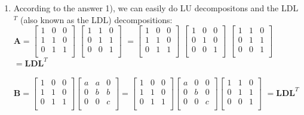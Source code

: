 \documentclass[english,onecolumn]{IEEEtran}
\begin{document}
\begin{enumerate}
    
    
     
    \item 
    According to the answer 1), we can easily do LU decompositons and the LDL$^T$ (also known as the LDL) decompositions:\\
    $\mathbf{A}=
    \begin{bmatrix}
    1 & 0 & 0 \\
    1 & 1 & 0 \\
    0 & 1 & 1 \\
    \end{bmatrix}$
    $\begin{bmatrix}
    1 & 1 & 0 \\
    0 & 1 & 1 \\
    0 & 0 & 1 \\
    \end{bmatrix}$
    $=\begin{bmatrix}
    1 & 0 & 0 \\
    1 & 1 & 0 \\
    0 & 1 & 1 \\
    \end{bmatrix}$
    $\begin{bmatrix}
	1 & 0 & 0 \\
	0 & 1 & 0 \\
	0 & 0 & 1 \\
	\end{bmatrix}$
	$\begin{bmatrix}
	1 & 1 & 0 \\
	0 & 1 & 1 \\
	0 & 0 & 1 \\
	\end{bmatrix}$
	$=\mathbf{L}\mathbf{D}\mathbf{L}^{T}$\\\\	
	$\mathbf{B}=
	\begin{bmatrix}
	1 & 0 & 0 \\
	1 & 1 & 0 \\
	0 & 1 & 1 \\
	\end{bmatrix}
	\begin{bmatrix}
	a & a & 0 \\
	0 & b & b \\
	0 & 0 & c \\
	\end{bmatrix}
	=\begin{bmatrix}
	1 & 0 & 0 \\
	1 & 1 & 0 \\
	0 & 1 & 1 \\
	\end{bmatrix}
	\begin{bmatrix}
	a & 0 & 0 \\
	0 & b & 0 \\
	0 & 0 & c \\
	\end{bmatrix}
	\begin{bmatrix}
	1 & 1 & 0 \\
	0 & 1 & 1 \\
	0 & 0 & 1 \\
	\end{bmatrix}	
	$
	$=\mathbf{L}\mathbf{D}\mathbf{L}^{T}$    
\end{enumerate}
\end{document}
